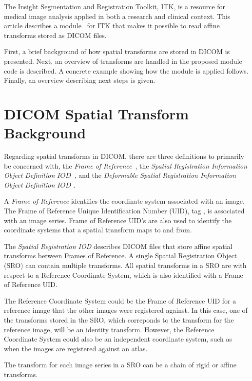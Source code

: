 \documentclass{InsightArticle}
\begin{document}
The Insight Segmentation and Registration Toolkit, ITK, is a resource for
medical image analysis applied in both a research and clinical context. This
article describes a module~\cite{ITKModules} for ITK that makes it possible to read affine
transforms stored as DICOM files.

First, a brief background of how spatial transforms are stored in DICOM is
presented. Next, an overview of transforms are handled in the proposed module
code is described. A concrete example showing how the module is applied
follows.  Finally, an overview describing next steps is given.


\section{DICOM Spatial Transform Background}

Regarding spatial transforms in DICOM, there are three definitions to
primarily be concerned with, the \textit{Frame of
Reference}~\cite{DICOMFrameOfReference}, the \textit{Spatial Registration
Information Object Definition \(IOD\)}~\cite{DICOMSRO,DICOMSROSupp}, and the
\textit{Deformable Spatial Registration Information Object Definition \(IOD\)}
\cite{DICOMSRO,DICOMDSROSupp}.

A \textit{Frame of Reference} identifies the coordinate system associated with
an image. The Frame of Reference Unique Identification Number (UID), tag
, is associated with an image series. Frame of Reference
UID's are also used to identify the coordinate systems that a spatial
transform maps to and from.

The \textit{Spatial Registration IOD} describes DICOM files that store affine
spatial transforms between Frames of Reference. A single Spatial Registration
Object (SRO) can contain multiple transforms. All spatial transforms in a
SRO are with respect to a Reference Coordinate System, which is also
identified with a Frame of Reference UID.

The Reference Coordinate System could be the Frame of Reference UID for a
reference image that the other images were registered against. In this case,
one of the transforms stored in the SRO, which correponds to the transform for
the reference image, will be an identity transform. However, the Reference
Coordinate System could also be an independent coordinate system, such as when
the images are registered against an atlas.

The transform for each image series in a SRO can be a chain of rigid or affine
transforms.
\end{document}
